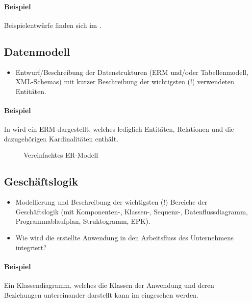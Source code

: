 \paragraph{Beispiel}
Beispielentwürfe finden sich im .


\subsection{Datenmodell}
\label{sec:Datenmodell}

\begin{itemize}
	\item Entwurf/Beschreibung der Datenstrukturen (\zB \acs{ERM} und/oder Tabellenmodell, \acs{XML}-Schemas) mit kurzer Beschreibung der wichtigsten (!) verwendeten Entitäten.
\end{itemize}

\paragraph{Beispiel}
In  wird ein \ac{ERM} dargestellt, welches lediglich Entitäten, Relationen und die dazugehörigen Kardinalitäten enthält. 

\begin{figure}[htb]
\centering
{}
\caption{Vereinfachtes ER-Modell}
\label{fig:ER}
\end{figure} 


\subsection{Geschäftslogik}
\label{sec:Geschaeftslogik}

\begin{itemize}
	\item Modellierung und Beschreibung der wichtigsten (!) Bereiche der Geschäftslogik (\zB mit Kom\-po\-nen\-ten-, Klassen-, Sequenz-, Datenflussdiagramm, Programmablaufplan, Struktogramm, \ac{EPK}).
	\item Wie wird die erstellte Anwendung in den Arbeitsfluss des Unternehmens integriert?
\end{itemize}

\paragraph{Beispiel}
Ein Klassendiagramm, welches die Klassen der Anwendung und deren Beziehungen untereinander darstellt kann im  eingesehen werden.

